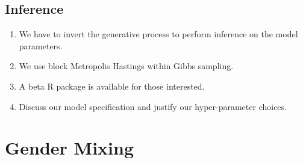 \documentclass[fleqn]{MJDArticle}
\begin{document}
\subsection{Inference}
\begin{enumerate}
	\item We have to invert the generative process to perform inference on the model parameters.
	\item We use block Metropolis Hastings within Gibbs sampling.
	\item A beta R package is available for those interested.
	\item Discuss our model specification and justify our hyper-parameter choices.
\end{enumerate}

\section{Gender Mixing}
\end{document}
